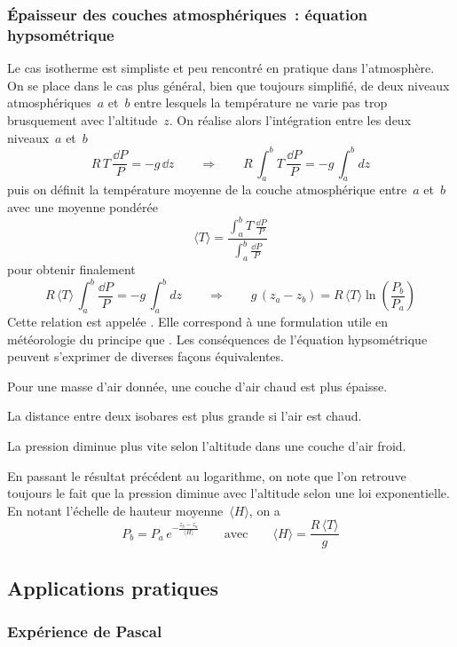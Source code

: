 \sk
\subsubsection{\'Epaisseur des couches atmosphériques~: équation hypsométrique}

\sk
Le cas isotherme est simpliste et peu rencontré en pratique dans l'atmosphère. On se place dans le cas plus général, bien que toujours simplifié, de deux niveaux atmosphériques~$a$ et~$b$ entre lesquels la température ne varie pas trop brusquement avec l'altitude~$z$. On réalise alors l'intégration entre les deux niveaux~$a$ et~$b$
\[R \, T \, \frac{\dd P}{P} = - g \, \dd z \qquad \Rightarrow \qquad R \, \int_a^b T\, \frac{\dd P}{P} = - g \, \int_a^b dz\]
puis on définit la température moyenne de la couche atmosphérique entre~$a$ et~$b$ avec une moyenne pondérée
\[ \langle T \rangle = \frac{\int_a^b T \, \frac{\dd P}{P}}{\int_a^b \frac{\dd P}{P}} \]
pour obtenir finalement
\[R \, \langle T \rangle \, \int_a^b \frac{\dd P}{P} = - g \, \int_a^b dz
\qquad \Rightarrow \qquad \boxed{ g \, (z_a - z_b) = R \, \langle T \rangle \ln \left( \frac{P_b}{P_a} \right) } \]
Cette relation est appelée . Elle correspond à une formulation utile en météorologie du principe que . Les conséquences de l'équation hypsométrique peuvent s'exprimer de diverses façons équivalentes.
\begin{citemize}
\item Pour une masse d'air donnée, une couche d'air chaud est plus épaisse.
\item La distance entre deux isobares est plus grande si l'air est chaud.
\item La pression diminue plus vite selon l'altitude dans une couche d'air froid.
\end{citemize}
En passant le résultat précédent au logarithme, on note que l'on retrouve toujours le fait que la pression diminue avec l'altitude selon une loi exponentielle. En notant l'échelle de hauteur moyenne~$\langle H \rangle$, on a
\[ P_b = P_a \, e^{ - \frac{z_b - z_a}{\langle H \rangle}} \qquad \text{avec} \qquad \langle H \rangle = \frac{R \, \langle T \rangle}{g} \]

\sk
\subsection{Applications pratiques}

\sk
\subsubsection{Expérience de Pascal}

